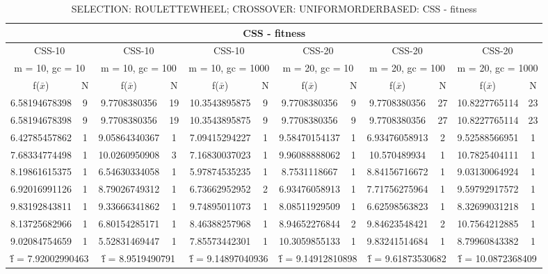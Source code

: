 \begin{table}[H]
	\centering
	\caption{SELECTION: ROULETTEWHEEL; CROSSOVER: UNIFORMORDERBASED: CSS - fitness}
	\begin{adjustbox}{width=1\textwidth}
		\begin{tabular}{ |c|c||c|c||c|c||c|c||c|c||c|c| }
			\hline
			\multicolumn{12}{|c|}{CSS - fitness} \\
			\hline
			\multicolumn{2}{|c||}{CSS-10} & \multicolumn{2}{c||}{CSS-10} & \multicolumn{2}{c||}{CSS-10} & \multicolumn{2}{c||}{CSS-20} & \multicolumn{2}{c||}{CSS-20} & \multicolumn{2}{c|}{CSS-20}\\
			\hline
			\multicolumn{2}{|c||}{m = 10, gc = 10} & \multicolumn{2}{c||}{m = 10, gc = 100} & \multicolumn{2}{c||}{m = 10, gc = 1000} & \multicolumn{2}{c||}{m = 20, gc = 10} & \multicolumn{2}{c||}{m = 20, gc = 100} & \multicolumn{2}{c|}{m = 20, gc = 1000}\\
			\hline
			f($\bar{x}$) & N & f($\bar{x}$) & N & f($\bar{x}$) & N & f($\bar{x}$) & N & f($\bar{x}$) & N & f($\bar{x}$) & N\\
			\hline
			\hline
			6.58194678398 & 9 & 9.7708380356 & 19 & 10.3543895875 & 9 & 9.7708380356 & 9 & 9.7708380356 & 27 & 10.8227765114 & 23\\
			\hline
			6.58194678398 & 9 & 9.7708380356 & 19 & 10.3543895875 & 9 & 9.7708380356 & 9 & 9.7708380356 & 27 & 10.8227765114 & 23\\
			6.42785457862 & 1 & 9.05864340367 & 1 & 7.09415294227 & 1 & 9.58470154137 & 1 & 6.93476058913 & 2 & 9.52588566951 & 1\\
			7.68334774498 & 1 & 10.0260950908 & 3 & 7.16830037023 & 1 & 9.96088888062 & 1 & 10.570489934 & 1 & 10.7825404111 & 1\\
			8.19861615375 & 1 & 6.54630334058 & 1 & 5.97874535235 & 1 & 8.7531118667 & 1 & 8.84156716672 & 1 & 9.03130064924 & 1\\
			6.92016991126 & 1 & 8.79026749312 & 1 & 6.73662952952 & 2 & 6.93476058913 & 1 & 7.71756275964 & 1 & 9.59792917572 & 1\\
			9.83192843811 & 1 & 9.33666341862 & 1 & 9.74895011073 & 1 & 8.08511929509 & 1 & 6.62598563823 & 1 & 8.32699031218 & 1\\
			8.13725682966 & 1 & 6.80154285171 & 1 & 8.46388257968 & 1 & 8.94652276844 & 2 & 9.84623548421 & 2 & 10.7564212885 & 1\\
			9.02084754659 & 1 & 5.52831469447 & 1 & 7.85573442301 & 1 & 10.3059855133 & 1 & 9.83241514684 & 1 & 8.79960843382 & 1\\
			\hline
			\multicolumn{2}{|c||}{\^{f} = 7.92002990463} & \multicolumn{2}{c||}{\^{f} = 8.9519490791} & \multicolumn{2}{c||}{\^{f} = 9.14897040936} & \multicolumn{2}{c||}{\^{f} = 9.14912810898} & \multicolumn{2}{c||}{\^{f} = 9.61873530682} & \multicolumn{2}{c|}{\^{f} = 10.0872368409}\\
			\hline
		\end{tabular}
	\end{adjustbox}
\end{table}
